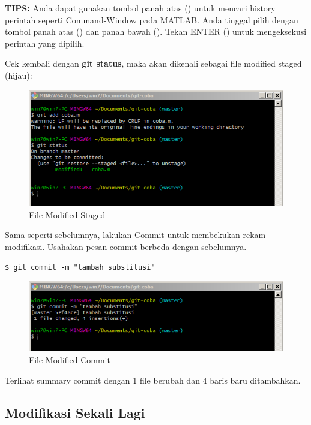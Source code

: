 \documentclass[12pt]{book}
\begin{document}
	\textbf{TIPS:} Anda dapat gunakan tombol panah atas (\keys{$\uparrow$}) untuk mencari history perintah seperti Command-Window pada MATLAB.
	Anda tinggal pilih dengan tombol panah atas (\keys{$\uparrow$}) dan panah bawah (\keys{$\downarrow$}).
	Tekan ENTER (\keys{\return}) untuk mengeksekusi perintah yang dipilih.

	\newpage
	Cek kembali dengan \textbf{git status}, maka akan dikenali sebagai file modified staged (hijau):
	\begin{figure}[!ht]
		\centering
		\includegraphics[width=400pt]{images/git8}
		\caption{File Modified Staged}
	\end{figure}
	
	Sama seperti sebelumnya, lakukan Commit untuk membekukan rekam modifikasi.
	Usahakan pesan commit berbeda dengan sebelumnya.
	\begin{verbatim}
$ git commit -m "tambah substitusi"
	\end{verbatim}

	\begin{figure}[!ht]
		\centering
		\includegraphics[width=400pt]{images/git9}
		\caption{File Modified Commit}
	\end{figure}

	Terlihat summary commit dengan 1 file berubah dan 4 baris baru ditambahkan.
	
	\subsection{Modifikasi Sekali Lagi}
	
\end{document}
